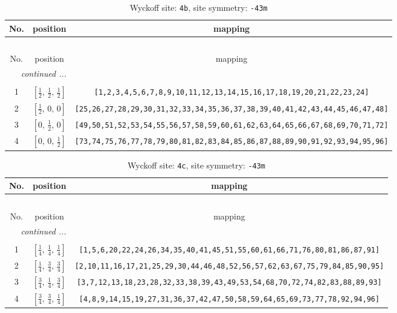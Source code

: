 \documentclass[fleqn,8pt]{jsarticle}
\begin{document}
\begin{longtable}{ccc}
\caption{Wyckoff site: {\tt 4b}, site symmetry: {\tt -43m}}
 \\
 \hline \hline
No. & position & mapping \\ \hline \endfirsthead

\multicolumn{2}{l}{\tablename\ \thetable{}} \\
 \hline \hline
No. & position & mapping \\ \hline \endhead

 \hline \hline
\multicolumn{2}{r}{\footnotesize\it continued ...} \\ \endfoot

 \hline \hline
\multicolumn{2}{r}{} \\ \endlastfoot

1 & $\left[ \frac{1}{2},\, \frac{1}{2},\, \frac{1}{2} \right]$ & {\tt [1,2,3,4,5,6,7,8,9,10,11,12,13,14,15,16,17,18,19,20,21,22,23,24]} \\ \hline
2 & $\left[ \frac{1}{2},\, 0,\, 0 \right]$ & {\tt [25,26,27,28,29,30,31,32,33,34,35,36,37,38,39,40,41,42,43,44,45,46,47,48]} \\ \hline
3 & $\left[ 0,\, \frac{1}{2},\, 0 \right]$ & {\tt [49,50,51,52,53,54,55,56,57,58,59,60,61,62,63,64,65,66,67,68,69,70,71,72]} \\ \hline
4 & $\left[ 0,\, 0,\, \frac{1}{2} \right]$ & {\tt [73,74,75,76,77,78,79,80,81,82,83,84,85,86,87,88,89,90,91,92,93,94,95,96]} \\
\end{longtable}
\renewcommand{\arraystretch}{1.2}
\begin{longtable}{ccc}
\caption{Wyckoff site: {\tt 4c}, site symmetry: {\tt -43m}}
 \\
 \hline \hline
No. & position & mapping \\ \hline \endfirsthead

\multicolumn{2}{l}{\tablename\ \thetable{}} \\
 \hline \hline
No. & position & mapping \\ \hline \endhead

 \hline \hline
\multicolumn{2}{r}{\footnotesize\it continued ...} \\ \endfoot

 \hline \hline
\multicolumn{2}{r}{} \\ \endlastfoot

1 & $\left[ \frac{1}{4},\, \frac{1}{4},\, \frac{1}{4} \right]$ & {\tt [1,5,6,20,22,24,26,34,35,40,41,45,51,55,60,61,66,71,76,80,81,86,87,91]} \\ \hline
2 & $\left[ \frac{1}{4},\, \frac{3}{4},\, \frac{3}{4} \right]$ & {\tt [2,10,11,16,17,21,25,29,30,44,46,48,52,56,57,62,63,67,75,79,84,85,90,95]} \\ \hline
3 & $\left[ \frac{3}{4},\, \frac{1}{4},\, \frac{3}{4} \right]$ & {\tt [3,7,12,13,18,23,28,32,33,38,39,43,49,53,54,68,70,72,74,82,83,88,89,93]} \\ \hline
4 & $\left[ \frac{3}{4},\, \frac{3}{4},\, \frac{1}{4} \right]$ & {\tt [4,8,9,14,15,19,27,31,36,37,42,47,50,58,59,64,65,69,73,77,78,92,94,96]} \\
\end{longtable}
\end{document}
